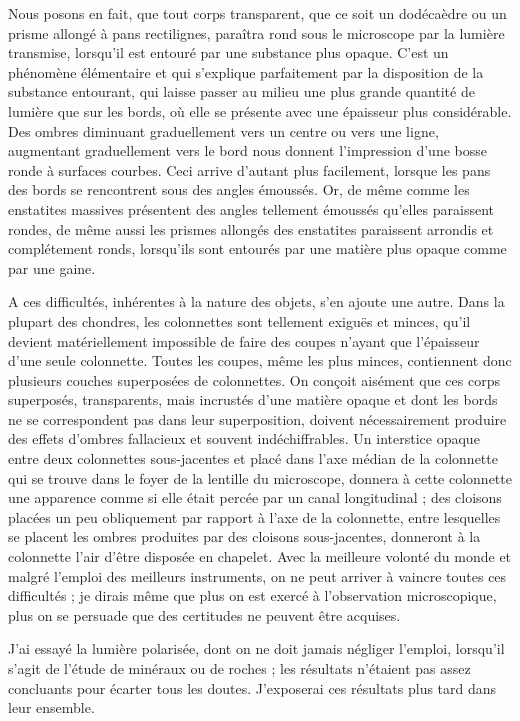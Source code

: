\documentclass[a4paper, 12pt, oneside, french]{book}
\begin{document}
Nous posons en fait, que tout corps transparent, que ce soit un dodécaèdre ou un prisme allongé à pans rectilignes, paraîtra rond sous le microscope par la lumière transmise, lorsqu'il est entouré par une substance plus opaque. C'est un phénomène élémentaire et qui s'explique parfaitement par la disposition de la substance entourant, qui laisse passer au milieu une plus grande quantité de lumière que sur les bords, où elle se présente avec une épaisseur plus considérable. Des ombres diminuant graduellement vers un centre ou vers une ligne, augmentant graduellement vers le bord nous donnent l'impression d'une bosse ronde à surfaces courbes. Ceci arrive d'autant plus facilement, lorsque les pans des bords se rencontrent sous des angles émoussés. Or, de même comme les enstatites massives présentent des angles tellement émoussés qu'elles paraissent rondes, de même aussi les prismes allongés des enstatites paraissent arrondis et complétement ronds, lorsqu'ils sont entourés par une matière plus opaque comme par une gaine.

A ces difficultés, inhérentes à la nature des objets, s'en ajoute une autre. Dans la plupart des chondres, les colonnettes sont tellement exiguës et minces, qu'il devient matériellement impossible de faire des coupes n'ayant que l'épaisseur d'une seule colonnette. Toutes les coupes, même les plus minces, contiennent donc plusieurs couches superposées de colonnettes. On conçoit aisément que ces corps superposés, transparents, mais incrustés d'une matière opaque et dont les bords ne se correspondent pas dans leur superposition, doivent nécessairement produire des effets d'ombres fallacieux et souvent indéchiffrables. Un interstice opaque entre deux colonnettes sous-jacentes et placé dans l'axe médian de la colonnette qui se trouve dans le foyer de la lentille du microscope, donnera à cette colonnette une apparence comme si elle était percée par un canal longitudinal ; des cloisons placées un peu obliquement par rapport à l'axe de la colonnette, entre lesquelles se placent les ombres produites par des cloisons sous-jacentes, donneront à la colonnette l'air d'être disposée en chapelet. Avec la meilleure volonté du monde et malgré l'emploi des meilleurs instruments, on ne peut arriver à vaincre toutes ces difficultés ; je dirais même que plus on est exercé à l'observation microscopique, plus on se persuade que des certitudes ne peuvent être acquises.

J'ai essayé la lumière polarisée, dont on ne doit jamais négliger l'emploi, lorsqu'il s'agit de l'étude de minéraux ou de roches ; les résultats n'étaient pas assez concluants pour écarter tous les doutes. J'exposerai ces résultats plus tard dans leur ensemble.
\end{document}

